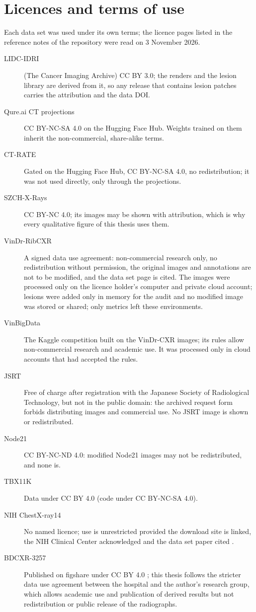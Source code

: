 

\section{Licences and terms of use}
Each data set was used under its own terms; the licence pages listed in the reference notes of the repository were read on 3 November 2026.
\begin{description}
\item[LIDC-IDRI] (The Cancer Imaging Archive) CC BY 3.0; the renders and the lesion library are derived from it, so any release that contains
 lesion patches carries the attribution and the data DOI.
\item[Qure.ai CT projections] CC BY-NC-SA 4.0 on the Hugging Face Hub. Weights trained on them inherit the non-commercial, share-alike terms.
\item[CT-RATE] Gated on the Hugging Face Hub, CC BY-NC-SA 4.0, no redistribution; it was not used directly, only through the projections.
\item[SZCH-X-Rays] CC BY-NC 4.0; its images may be shown with attribution, which is why every qualitative figure of this thesis uses them.
\item[VinDr-RibCXR] A signed data use agreement: non-commercial research only, no redistribution without permission, the original images and
 annotations are not to be modified, and the data set page is cited. The images were processed only on the licence holder's computer and
 private cloud account; lesions were added only in memory for the audit and no modified image was stored or shared; only metrics left these
 environments.
\item[VinBigData] The Kaggle competition built on the VinDr-CXR images; its rules allow non-commercial research and academic use. It was
 processed only in cloud accounts that had accepted the rules.
\item[JSRT] Free of charge after registration with the Japanese Society of Radiological Technology, but not in the public domain: the
 archived request form forbids distributing images and commercial use. No JSRT image is shown or redistributed.
\item[Node21] CC BY-NC-ND 4.0: modified Node21 images may not be redistributed, and none is.
\item[TBX11K] Data under CC BY 4.0 (code under CC BY-NC-SA 4.0).
\item[NIH ChestX-ray14] No named licence; use is unrestricted provided the download site is linked, the NIH Clinical Center acknowledged and the
 data set paper cited \citep{wang2017chestxray}.
\item[BDCXR-3257] Published on figshare under CC BY 4.0 \citep{durjoy2026bdcxr}; this thesis follows the stricter data use agreement between
 the hospital and the author's research group, which allows academic use and publication of derived results but not redistribution or public
 release of the radiographs.
\end{description}
